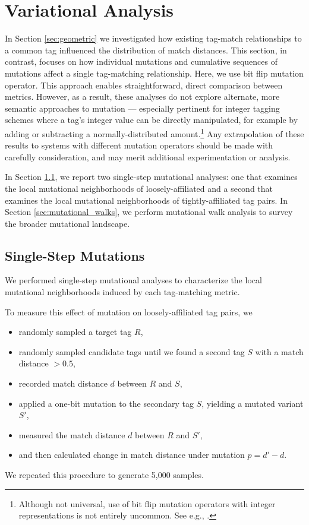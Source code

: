 \section{Variational Analysis} \label{sec:variational}

In Section \ref{sec:geometric} we investigated how existing tag-match relationships to a common tag influenced the distribution of match distances.
This section, in contrast, focuses on how individual mutations and cumulative sequences of mutations affect a single tag-matching relationship.
Here, we use bit flip mutation operator.
This approach enables straightforward, direct comparison between metrics.
However, as a result, these analyses do not explore alternate, more semantic approaches to mutation --- especially pertinent for integer tagging schemes where a tag's integer value can be directly manipulated, for example by adding or subtracting a normally-distributed amount.\footnote{
Although not universal, use of bit flip mutation operators with integer representations is not entirely uncommon.
See e.g., \cite{downing2015intelligence}.
}
Any extrapolation of these results to systems with different mutation operators should be made with carefully consideration, and may merit additional experimentation or analysis.

In Section \ref{sec:single_step}, we report two single-step mutational analyses: one that examines the local mutational neighborhoods of loosely-affiliated and a second that examines the local mutational neighborhoods of tightly-affiliated tag pairs.
In Section \ref{sec:mutational_walks}, we perform mutational walk analysis to survey the broader mutational landscape.

\subsection{Single-Step Mutations} \label{sec:single_step}



We performed single-step mutational analyses to characterize the local mutational neighborhoods induced by each tag-matching metric.

To measure this effect of mutation on loosely-affiliated tag pairs, we
\begin{itemize}
    \item randomly sampled a target tag $R$,
    \item randomly sampled candidate tags until we found a second tag $S$ with a match distance $> 0.5$,
    \item recorded match distance $d$ between $R$ and $S$,
    \item applied a one-bit mutation to the secondary tag $S$, yielding a mutated variant $S'$,
    \item measured the match distance $d$ between $R$ and $S'$,
    \item and then calculated change in match distance under mutation $p = d' - d$.
\end{itemize}
We repeated this procedure to generate 5,000 samples.

